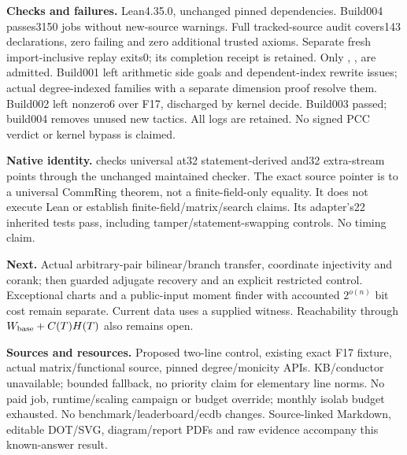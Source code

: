 \documentclass[11pt]{article}
\begin{document}
\textbf{Checks and failures.} Lean4.35.0, unchanged pinned dependencies.
Build004 passes3150 jobs without new-source warnings. Full tracked-source
audit covers143 declarations, zero failing and zero additional trusted axioms.
Separate fresh import-inclusive replay exits0; its completion receipt is retained.
Only , ,  are admitted.
Build001 left arithmetic side goals and dependent-index rewrite issues;
actual degree-indexed families with a separate dimension proof resolve them.
Build002 left nonzero6 over F17, discharged by kernel decide. Build003 passed;
build004 removes unused new tactics. All logs are retained. No signed PCC
verdict or kernel bypass is claimed.

\textbf{Native identity.}  checks universal
 at32 statement-derived and32 extra-stream points through
the unchanged maintained checker. The exact source pointer is to a universal
CommRing theorem, not a finite-field-only equality. It does not execute Lean
or establish finite-field/matrix/search claims. Its adapter's22 inherited
tests pass, including tamper/statement-swapping controls. No timing claim.

\textbf{Next.} Actual arbitrary-pair bilinear/branch transfer, coordinate
injectivity and corank; then guarded adjugate recovery and an explicit
restricted control. Exceptional charts and a public-input moment finder with
accounted $2^{o(n)}$ bit cost remain separate. Current data uses a supplied
witness. Reachability through $W_{\rm base}+C(T)H(T)$ also remains open.

\textbf{Sources and resources.} Proposed two-line control, existing exact
F17 fixture, actual matrix/functional source, pinned degree/monicity APIs.
KB/conductor unavailable; bounded fallback, no priority claim for elementary
line norms. No paid job, runtime/scaling campaign or budget override; monthly
isolab budget exhausted. No benchmark/leaderboard/ecdb changes. Source-linked
Markdown, editable DOT/SVG, diagram/report PDFs and raw evidence accompany this
known-answer result.
\end{document}
